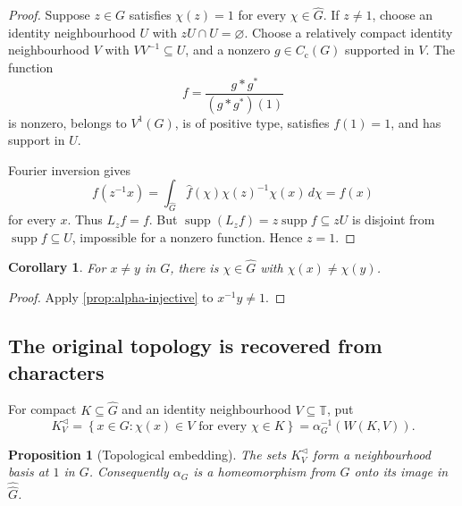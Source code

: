 \documentclass[11pt]{article}
\newtheorem{proposition}[theorem]{Proposition}
\newtheorem{corollary}[theorem]{Corollary}
\theoremstyle{definition}
\theoremstyle{remark}
\newcommand{\T}{\mathbb T}
\newcommand{\supp}{\operatorname{supp}}
\newcommand{\Cc}{C_{\mathrm c}}
\newcommand{\dual}[1]{\widehat{#1}}
\newcommand{\bidual}[1]{\widehat{\widehat{#1}}}
\newcommand{\set}[1]{\left\{#1\right\}}
\begin{document}
\begin{proof}
Suppose $z\in G$ satisfies $\chi(z)=1$ for every $\chi\in\dual G$.  If $z\neq1$, choose
an identity neighbourhood $U$ with $zU\cap U=\varnothing$.  Choose a relatively compact
identity neighbourhood $V$ with $VV^{-1}\subseteq U$, and a nonzero
$g\in\Cc(G)$ supported in $V$.  The function
\[
  f=\frac{g*g^*}{(g*g^*)(1)}
\]
is nonzero, belongs to $V^1(G)$, is of positive type, satisfies $f(1)=1$, and has support
in $U$.

Fourier inversion gives
\[
 f(z^{-1}x)=\int_{\dual G}\widehat f(\chi)
       \chi(z)^{-1}\chi(x)\,d\chi=f(x)
\]
for every $x$.  Thus $L_zf=f$.  But $\supp(L_zf)=z\supp f\subseteq zU$ is disjoint from
$\supp f\subseteq U$, impossible for a nonzero function.  Hence $z=1$.
\end{proof}

\begin{corollary}
\label{cor:characters-separate}
For $x\neq y$ in $G$, there is $\chi\in\dual G$ with $\chi(x)\neq\chi(y)$.
\end{corollary}

\begin{proof}
Apply \cref{prop:alpha-injective} to $x^{-1}y\neq1$.
\end{proof}

\subsection{The original topology is recovered from characters}

For compact $K\subseteq\dual G$ and an identity neighbourhood $V\subseteq\T$, put
\[
  K^{\triangleleft}_V
  =\set{x\in G:\chi(x)\in V\text{ for every }\chi\in K}
  =\alpha_G^{-1}(W(K,V)).
\]

\begin{proposition}[Topological embedding]
\label{prop:alpha-embedding}
The sets $K^{\triangleleft}_V$ form a neighbourhood basis at $1$ in $G$.  Consequently
$\alpha_G$ is a homeomorphism from $G$ onto its image in $\bidual G$.
\end{proposition}
\end{document}
